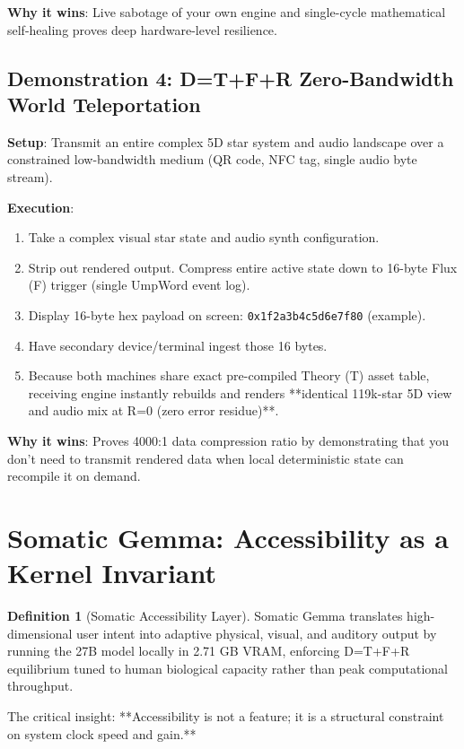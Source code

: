 \documentclass[11pt,oneside]{article}
\theoremstyle{definition}
\newtheorem{definition}[theorem]{Definition}
\begin{document}
\textbf{Why it wins}: Live sabotage of your own engine and single-cycle mathematical self-healing proves deep hardware-level resilience.

\subsection{Demonstration 4: D=T+F+R Zero-Bandwidth World Teleportation}

\textbf{Setup}: Transmit an entire complex 5D star system and audio landscape over a constrained low-bandwidth medium (QR code, NFC tag, single audio byte stream).

\textbf{Execution}:
\begin{enumerate}
  \item Take a complex visual star state and audio synth configuration.
  \item Strip out rendered output. Compress entire active state down to 16-byte Flux (F) trigger (single UmpWord event log).
  \item Display 16-byte hex payload on screen: \texttt{0x1f2a3b4c5d6e7f80} (example).
  \item Have secondary device/terminal ingest those 16 bytes.
  \item Because both machines share exact pre-compiled Theory (T) asset table, receiving engine instantly rebuilds and renders **identical 119k-star 5D view and audio mix at R=0 (zero error residue)**.
\end{enumerate}

\textbf{Why it wins}: Proves 4000:1 data compression ratio by demonstrating that you don't need to transmit rendered data when local deterministic state can recompile it on demand.

\section{Somatic Gemma: Accessibility as a Kernel Invariant}

\begin{definition}[Somatic Accessibility Layer]
Somatic Gemma translates high-dimensional user intent into adaptive physical, visual, and auditory output by running the 27B model locally in 2.71 GB VRAM, enforcing D=T+F+R equilibrium tuned to human biological capacity rather than peak computational throughput.

The critical insight: **Accessibility is not a feature; it is a structural constraint on system clock speed and gain.**
\end{definition}
\end{document}
